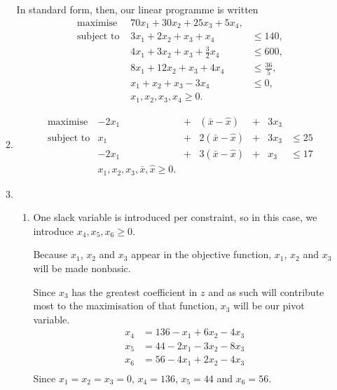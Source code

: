 \documentclass[10pt]{article}
\begin{document}
\begin{enumerate}
\begin{enumerate}
        In standard form, then, our linear programme is written
        \begin{align*}
          &\text{maximise   }   &   70x_1 + 30x_2 + 25x_3 + 5x_4, \\
          &\text{subject to   } &   3x_1  + 2x_2  + x_3   + x_4            &\leq 140, \\
          &                     &  4x_1  + 3x_2  + x_3   + \tfrac{3}{2}x_4 &\leq 600, \\
          &                     &  8x_1  + 12x_2 + x_3   + 4x_4            &\leq \frac{36}{5}, \\
          &                     &   x_1  + x_2   + x_3   - 3x_4            &\leq 0, \\
          &                     & x_1, x_2, x_3, x_4 \geq 0.&
        \end{align*}
      \item
        \begin{align*}
          &\text{maximise}    & -2x_1 &+& (\bar x - \hat x) &+& 3x_3 \\
          &\text{subject to}  &   x_1 &+& 2(\bar x - \hat x) &+& 3x_3 &\leq 25 \\
          &                   & -2x_1 &+& 3(\bar x - \hat x) &+& x_3 &\leq 17 \\
          &                   & x_1, x_2, x_3, \bar x, \hat x \geq 0.
        \end{align*}
      \item
      \begin{enumerate}
        \item One slack variable is introduced per constraint, so in this case,
          we introduce $x_4, x_5, x_6 \geq 0$.

          Because $x_1$, $x_2$ and $x_3$ appear in the objective function,
          $x_1$, $x_2$ and $x_3$ will be made nonbasic.

          Since $x_3$ has the greatest coefficient in $z$ and as such will
          contribute most to the maximisation of that function, $x_3$ will be
          our pivot variable.
          \begin{align*}
            x_4  &=  136  -  x_1  +  6x_2  -  4x_3 \\
            x_5  &=  44  -  2x_1  -  3x_2  -  8x_3 \\
            x_6  &=  56  -  4x_1  +  2x_2  -  4x_3 \\
          \end{align*}
          Since $x_1 = x_2 = x_3 = 0$, $x_4 = 136$, $x_5 = 44$ and $x_6 = 56$.


\end{enumerate}
\end{enumerate}
\end{enumerate}
\end{document}
